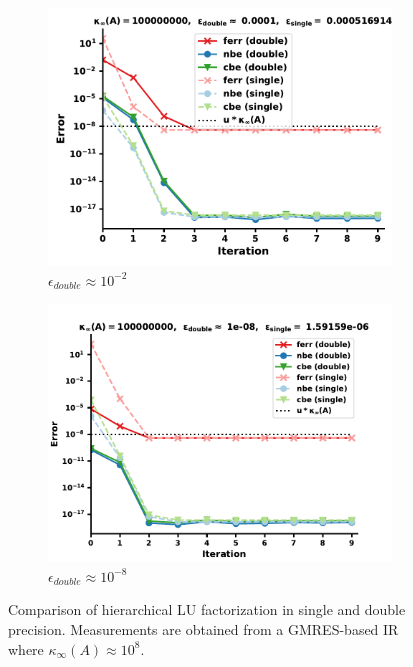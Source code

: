 \begin{figure}[h]
\centering
\begin{subfigure}{.5\textwidth}
  \centering
  \includegraphics[width=\linewidth]{chapters/5_experiments/figures/GMRES512_e3_0s.pdf}
  \caption{$\epsilon_{double} \approx 10^{-2}$}
  \label{fig:lrirsg3_1}
\end{subfigure}%
\begin{subfigure}{.5\textwidth}
  \centering
  \includegraphics[width=\linewidth]{chapters/5_experiments/figures/GMRES512_e3_1s.pdf}
  \caption{$\epsilon_{double} \approx 10^{-8}$}
  \label{fig:lrirsg3_2}
\end{subfigure}
\caption[Mixed Precision Low-Rank GMRES-IR 3]{Comparison of hierarchical LU factorization in single and double precision. Measurements are obtained from a GMRES-based IR where $\kappa_\infty(A) \approx 10^8$.}
\label{fig:lrirsg3}
\end{figure}

